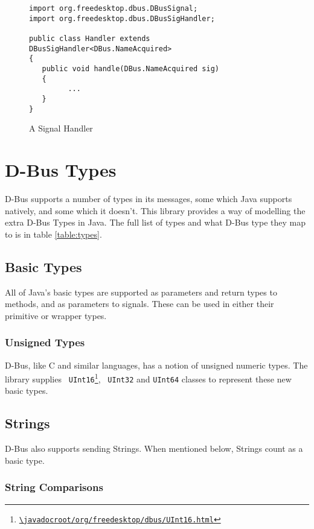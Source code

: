 \documentclass[a4paper,12pt]{article}
\begin{document}
\begin{figure}[htb]
\begin{center}
\begin{verbatim}
import org.freedesktop.dbus.DBusSignal;
import org.freedesktop.dbus.DBusSigHandler;

public class Handler extends DBusSigHandler<DBus.NameAcquired>
{
   public void handle(DBus.NameAcquired sig)
   {
         ...
   }
}
\end{verbatim}
\end{center}
\caption{A Signal Handler}
\label{fig:handler}
\end{figure}


\section{D-Bus Types}

D-Bus supports a number of types in its messages, some which Java
supports natively, and some which it doesn't. This library provides
a way of modelling the extra D-Bus Types in Java. The full list of
types and what D-Bus type they map to is in table \ref{table:types}.

\subsection{Basic Types}

All of Java's basic types are supported as parameters and return types to methods, and as parameters to signals. These can be used in either their primitive or wrapper types.

\subsubsection{Unsigned Types}

D-Bus, like C and similar languages, has a notion of unsigned numeric
types. The library supplies {\tt
UInt16\footnote{\url{\javadocroot/org/freedesktop/dbus/UInt16.html}}}, {\tt
UInt32} and {\tt UInt64} classes to represent these new basic types.

\subsection{Strings}

D-Bus also supports sending Strings. When mentioned below, Strings
count as a basic type.

\subsubsection{String Comparisons}
\end{document}
